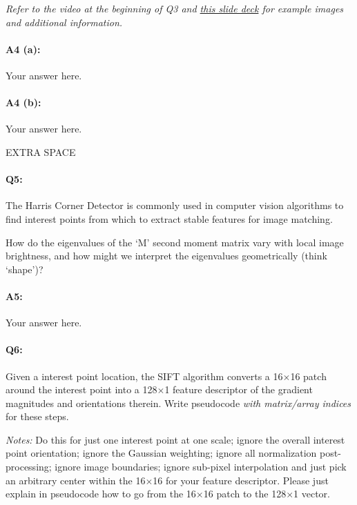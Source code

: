 \emph{Refer to the video at the beginning of Q3 and \href{http://biometrics.cse.msu.edu/Presentations/AnilJain_UniquenessOfFingerprints_NAS05.pdf}{this slide deck} for example images and additional information.}

\paragraph{A4 (a):} Your answer here.

\paragraph{A4 (b):} Your answer here.
\pagebreak


EXTRA SPACE
\pagebreak




\pagebreak
\paragraph{Q5:} 
The Harris Corner Detector is commonly used in computer vision algorithms to find interest points from which to extract stable features for image matching. 

How do the eigenvalues of the `M' second moment matrix vary with local image brightness, and how might we interpret the eigenvalues geometrically (think `shape')?

\paragraph{A5:} Your answer here.







\pagebreak
\paragraph{Q6:} Given a interest point location, the SIFT algorithm converts a 16$\times$16 patch around the interest point into a 128$\times$1 feature descriptor of the gradient magnitudes and orientations therein. Write pseudocode \emph{with matrix/array indices} for these steps.

\emph{Notes:} Do this for just one interest point at one scale; ignore the overall interest point orientation; ignore the Gaussian weighting; ignore all normalization post-processing; ignore image boundaries; ignore sub-pixel interpolation and just pick an arbitrary center within the 16$\times$16 for your feature descriptor. Please just explain in pseudocode how to go from the 16$\times$16 patch to the 128$\times$1 vector.

